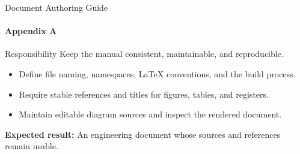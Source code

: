 \begin{frame}{Document Authoring Guide}
\framesubtitle{Appendix A}
\begin{block}{Responsibility}
Keep the manual consistent, maintainable, and reproducible.
\end{block}
\begin{itemize}
  \item Define file naming, namespaces, LaTeX conventions, and the build process.
  \item Require stable references and titles for figures, tables, and registers.
  \item Maintain editable diagram sources and inspect the rendered document.
\end{itemize}
\vspace{0.15cm}
\textbf{Expected result:} An engineering document whose sources and references remain usable.
\end{frame}
